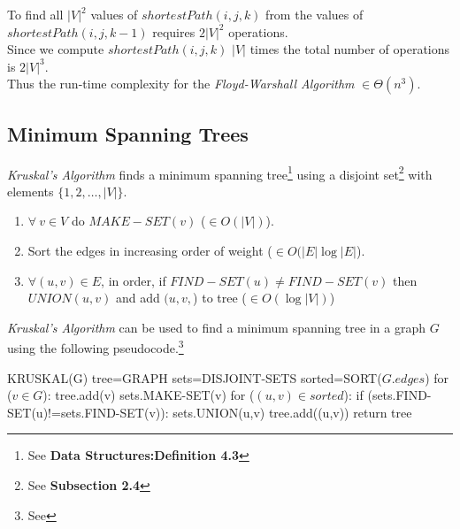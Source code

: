 \documentclass[11pt,a4paper]{article}
\begin{document}
To find all $|V|^2$ values of $shortestPath(i,j,k)$ from the values of $shortestPath(i,j,k-1)$ requires $2|V|^2$ operations.\\
Since we compute $shortestPath(i,j,k)$ $|V|$ times the total number of operations is $2|V|^3$.\\
Thus the run-time complexity for the \textit{Floyd-Warshall Algorithm} $\in \Theta(n^3)$.


\subsection{Minimum Spanning Trees}

\textit{Kruskal's Algorithm} finds a minimum spanning tree\footnote{See \textbf{Data Structures:Definition 4.3}} using a disjoint set\footnote{See \textbf{Subsection 2.4}} with elements $\{1,2,\dots,|V|\}$.
\begin{enumerate}[label=\roman*)]
  \item $\forall\ v\in V$ do $MAKE-SET(v)$ ($\in O(|V|)$).
  \item Sort the edges in increasing order of weight ($\in O(|E|\log|E|$).
  \item $\forall (u,v)\in E$, in order, if $FIND-SET(u)\neq FIND-SET(v)$ then $UNION(u,v)$ and add $(u,v,$) to tree ($\in O(\log|V|)$)
\end{enumerate}

\textit{Kruskal's Algorithm} can be used to find a minimum spanning tree in a graph $G$ using the following pseudocode.\footnote{See {}}
\begin{code}
KRUSKAL(G)
tree=GRAPH
sets=DISJOINT-SETS
sorted=SORT($G.edges$)
for ($v\in G$):
  tree.add(v)
  sets.MAKE-SET(v)
for ($(u,v)\in sorted$):
  if (sets.FIND-SET(u)!=sets.FIND-SET(v)):
    sets.UNION(u,v)
    tree.add((u,v))
return tree
\end{code}
\end{document}

